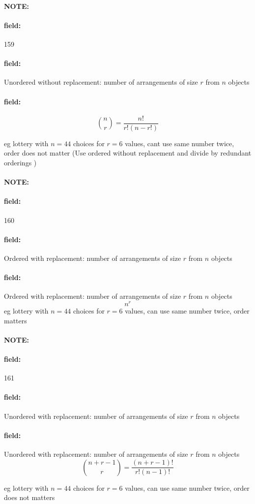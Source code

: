 \documentclass[12pt]{article}
\newenvironment{note}{\paragraph{NOTE:}}{}
\newenvironment{field}{\paragraph{field:}}{}
\begin{document}
\begin{note} \begin{field} \tiny 159 \end{field}
    \begin{field}
        Unordered without replacement: number of arrangements of size $r$ from $n$ objects
      \end{field}
    \begin{field}
        $$\binom{n}{r} = \frac{n!}{r!(n-r!)}$$

        eg lottery with $n=44$ choices for $r=6$ values, cant use same number twice, order does not matter (Use ordered without replacement and divide by redundant orderings )
    \end{field}
\end{note}


\begin{note} \begin{field} \tiny 160 \end{field}
    \begin{field}
        Ordered with replacement: number of arrangements of size $r$ from $n$ objects
    \end{field}
    \begin{field}
      Ordered with replacement: number of arrangements of size $r$ from $n$ objects
        $$n^r$$
        eg lottery with $n=44$ choices for $r=6$ values, can use same number twice, order matters
    \end{field}
\end{note}

\begin{note} \begin{field} \tiny 161 \end{field}
    \begin{field}
        Unordered with replacement: number of arrangements of size $r$ from $n$ objects
    \end{field}
    \begin{field}
      Unordered with replacement: number of arrangements of size $r$ from $n$ objects
        $$\binom{n+r-1}{r} = \frac{(n+r-1)!}{r!(n-1)!}$$

        eg lottery with $n=44$ choices for $r=6$ values, can use same number twice, order does not matters
    \end{field}
\end{note}
\end{document}
